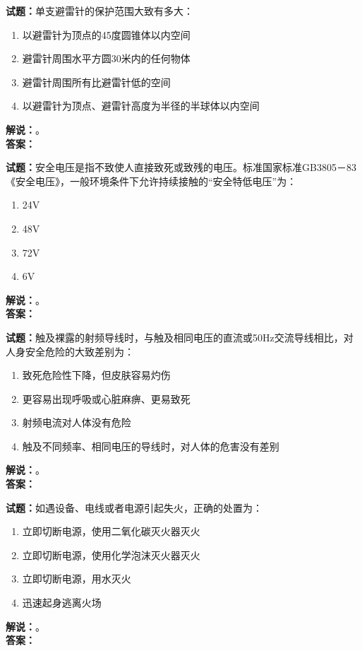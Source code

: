 \documentclass{ctexbook}
\begin{document}
\vspace{\baselineskip}

\noindent\textbf{试题：}单支避雷针的保护范围大致有多大：
\begin{enumerate}[leftmargin=3em]
  \item 以避雷针为顶点的45度圆锥体以内空间
  \item 避雷针周围水平方圆30米内的任何物体
  \item 避雷针周围所有比避雷针低的空间
  \item 以避雷针为顶点、避雷针高度为半径的半球体以内空间
\end{enumerate}
\noindent\textbf{解说：}\textbf{}。\\\noindent\textbf{答案：}

\vspace{\baselineskip}

\noindent\textbf{试题：}安全电压是指不致使人直接致死或致残的电压。标准国家标准GB3805－83《安全电压》，一般环境条件下允许持续接触的“安全特低电压”为：
\begin{enumerate}[leftmargin=3em]
  \item 24V
  \item 48V
  \item 72V
  \item 6V
\end{enumerate}
\noindent\textbf{解说：}\textbf{}。\\\noindent\textbf{答案：}

\vspace{\baselineskip}

\noindent\textbf{试题：}触及裸露的射频导线时，与触及相同电压的直流或50Hz交流导线相比，对人身安全危险的大致差别为：
\begin{enumerate}[leftmargin=3em]
  \item 致死危险性下降，但皮肤容易灼伤
  \item 更容易出现呼吸或心脏麻痹、更易致死
  \item 射频电流对人体没有危险
  \item 触及不同频率、相同电压的导线时，对人体的危害没有差别
\end{enumerate}
\noindent\textbf{解说：}\textbf{}。\\\noindent\textbf{答案：}

\vspace{\baselineskip}

\noindent\textbf{试题：}如遇设备、电线或者电源引起失火，正确的处置为：
\begin{enumerate}[leftmargin=3em]
  \item 立即切断电源，使用二氧化碳灭火器灭火
  \item 立即切断电源，使用化学泡沫灭火器灭火
  \item 立即切断电源，用水灭火
  \item 迅速起身逃离火场
\end{enumerate}
\noindent\textbf{解说：}\textbf{}。\\\noindent\textbf{答案：}
\end{document}
